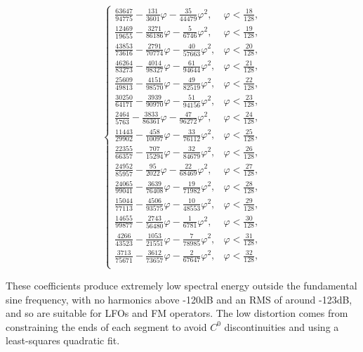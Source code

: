 \begin{equation*}
\begin{cases}
		\frac{63647}{94775} - \frac{131}{3601}\varphi - \frac{35}{44479}\varphi^2, & \varphi < \frac{18}{128},\\
		\frac{12469}{19655} - \frac{3271}{86186}\varphi - \frac{5}{6746}\varphi^2, & \varphi < \frac{19}{128},\\
		\frac{43853}{73616} - \frac{2791}{70774}\varphi - \frac{40}{57663}\varphi^2, & \varphi < \frac{20}{128},\\
		\frac{46264}{83273} - \frac{4014}{98327}\varphi - \frac{61}{94644}\varphi^2, & \varphi < \frac{21}{128},\\
		\frac{25609}{49813} - \frac{4151}{98570}\varphi - \frac{49}{82519}\varphi^2, & \varphi < \frac{22}{128},\\
		\frac{30250}{64171} - \frac{3939}{90970}\varphi - \frac{51}{94156}\varphi^2, & \varphi < \frac{23}{128},\\
		\frac{2464}{5763} - \frac{3833}{86361}\varphi - \frac{47}{96272}\varphi^2, & \varphi < \frac{24}{128},\\
		\frac{11443}{29902} - \frac{458}{10097}\varphi - \frac{33}{76112}\varphi^2, & \varphi < \frac{25}{128},\\
		\frac{22355}{66357} - \frac{707}{15294}\varphi - \frac{32}{84679}\varphi^2, & \varphi < \frac{26}{128},\\
		\frac{24952}{85957} - \frac{95}{2022}\varphi - \frac{22}{68469}\varphi^2, & \varphi < \frac{27}{128},\\
		\frac{24065}{99041} - \frac{3639}{76408}\varphi - \frac{19}{71982}\varphi^2, & \varphi < \frac{28}{128},\\
		\frac{15044}{77113} - \frac{4506}{93575}\varphi - \frac{10}{48553}\varphi^2, & \varphi < \frac{29}{128},\\
		\frac{14655}{99877} - \frac{2743}{56480}\varphi - \frac{1}{6781}\varphi^2, & \varphi < \frac{30}{128},\\
		\frac{4266}{43523} - \frac{1053}{21551}\varphi - \frac{7}{78985}\varphi^2, & \varphi < \frac{31}{128},\\
		\frac{3713}{75671} - \frac{3612}{73657}\varphi - \frac{2}{67647}\varphi^2, & \varphi < \frac{32}{128},\\
	\end{cases}
\end{equation*}

These coefficients produce extremely low spectral energy outside the fundamental sine frequency, with no harmonics above -120dB and an RMS of around -123dB, and so are suitable for LFOs and FM operators.  The low distortion comes from constraining the ends of each segment to avoid $C^0$ discontinuities and using a least-squares quadratic fit.

